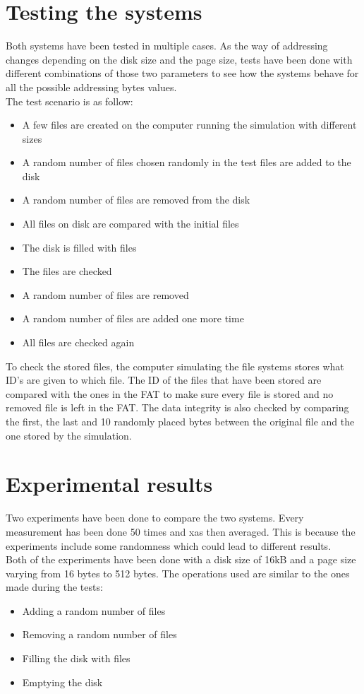 \documentclass[10pt,a4paper]{ULBreport}
\begin{document}
\chapter{Testing the systems}
Both systems have been tested in multiple cases. As the way of addressing changes depending on the disk size and the page size, tests have been done with different combinations of those two parameters to see how the systems behave for all the possible addressing bytes values.\\
The test scenario is as follow:
\begin{itemize}
    \item A few files are created on the computer running the simulation with different sizes
    \item A random number of files chosen randomly in the test files are added to the disk
    \item A random number of files are removed from the disk
    \item All files on disk are compared with the initial files
    \item The disk is filled with files
    \item The files are checked
    \item A random number of files are removed
    \item A random number of files are added one more time
    \item All files are checked again
\end{itemize}
To check the stored files, the computer simulating the file systems stores what ID's are given to which file. The ID of the files that have been stored are compared with the ones in the FAT to make sure every file is stored and no removed file is left in the FAT. The data integrity is also checked by comparing the first, the last and 10 randomly placed bytes between the original file and the one stored by the simulation.












\chapter{Experimental results}
Two experiments have been done to compare the two systems. Every measurement has been done 50 times and xas then averaged. This is because the experiments include some randomness which could lead to different results. \\
Both of the experiments have been done with a disk size of 16kB and a page size varying from 16 bytes to 512 bytes. The operations used are similar to the ones made during the tests:
\begin{itemize}
    \item Adding a random number of files
    \item Removing a random number of files
    \item Filling the disk with files
    \item Emptying the disk
\end{itemize}
\end{document}
